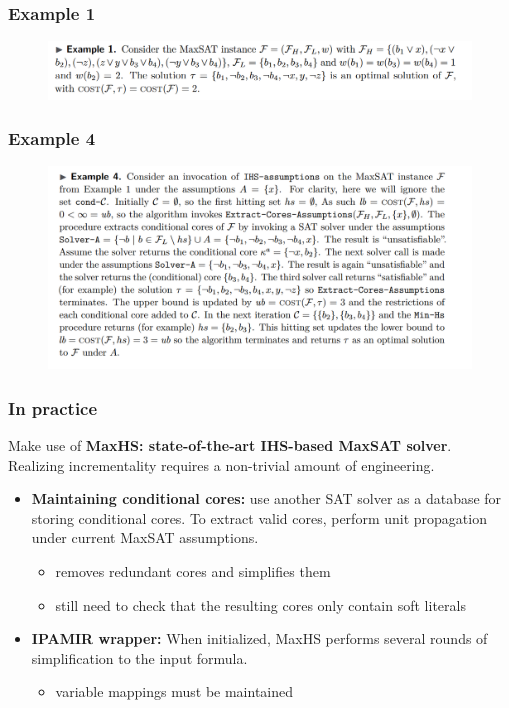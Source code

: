 \documentclass[aspectratio=169 %
,serif,mathserif]{beamer}
\begin{document}
\begin{frame}
	\frametitle{Example 1}
	\begin{figure}[htbp]
		\includegraphics[width=1\linewidth]{1.png}
	\end{figure}
\end{frame}

\begin{frame}
	\frametitle{Example 4}
	\begin{figure}[htbp]
		\includegraphics[width=.8\linewidth]{9.png}
	\end{figure}
\end{frame}

\begin{frame}
	\frametitle{In practice}
	Make use of \textbf{MaxHS: state-of-the-art IHS-based MaxSAT solver}. Realizing incrementality requires a non-trivial amount of engineering.
	\begin{itemize}
		\item \textbf{Maintaining conditional cores:} use another SAT solver as a database for storing conditional cores. To extract valid cores, perform unit propagation under current MaxSAT assumptions.
		\begin{itemize}
			\item removes redundant cores and simplifies them
			\item still need to check that the resulting cores only contain soft literals
		\end{itemize} \pause
		\item \textbf{IPAMIR wrapper:} When initialized, MaxHS performs several rounds of simplification to the input formula.
		\begin{itemize}
			\item variable mappings must be maintained
		\end{itemize} 
	\end{itemize}
\end{frame}
\end{document}
